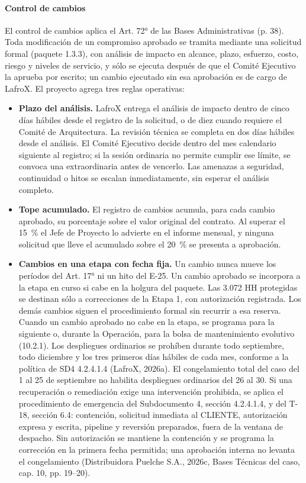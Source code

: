 \paragraph{Control de cambios} El control de cambios aplica el Art. 72° de las Bases Administrativas (p. 38). Toda modificación de un compromiso aprobado se tramita mediante una solicitud formal (paquete 1.3.3), con análisis de impacto en alcance, plazo, esfuerzo, costo, riesgo y niveles de servicio, y sólo se ejecuta después de que el Comité Ejecutivo la aprueba por escrito; un cambio ejecutado sin esa aprobación es de cargo de LafroX. El proyecto agrega tres reglas operativas:
\begin{itemize}
  \item \textbf{Plazo del análisis.} LafroX entrega el análisis de impacto dentro de cinco días hábiles desde el registro de la solicitud, o de diez cuando requiere el Comité de Arquitectura. La revisión técnica se completa en dos días hábiles desde el análisis. El Comité Ejecutivo decide dentro del mes calendario siguiente al registro; si la sesión ordinaria no permite cumplir ese límite, se convoca una extraordinaria antes de vencerlo. Las amenazas a seguridad, continuidad o hitos se escalan inmediatamente, sin esperar el análisis completo.
  \item \textbf{Tope acumulado.} El registro de cambios acumula, para cada cambio aprobado, su porcentaje sobre el valor original del contrato. Al superar el 15~\% el Jefe de Proyecto lo advierte en el informe mensual, y ninguna solicitud que lleve el acumulado sobre el 20~\% se presenta a aprobación.
  \item \textbf{Cambios en una etapa con fecha fija.} Un cambio nunca mueve los períodos del Art. 17° ni un hito del E-25. Un cambio aprobado se incorpora a la etapa en curso si cabe en la holgura del paquete. Las 3.072 HH protegidas se destinan sólo a correcciones de la Etapa 1, con autorización registrada. Los demás cambios siguen el procedimiento formal sin recurrir a esa reserva. Cuando un cambio aprobado no cabe en la etapa, se programa para la siguiente o, durante la Operación, para la bolsa de mantenimiento evolutivo (10.2.1). Los despliegues ordinarios se prohíben durante todo septiembre, todo diciembre y los tres primeros días hábiles de cada mes, conforme a la política de SD4 4.2.4.1.4 (LafroX, 2026a). El congelamiento total del caso del 1 al 25 de septiembre no habilita despliegues ordinarios del 26 al 30. Si una recuperación o remediación exige una intervención prohibida, se aplica el procedimiento de emergencia del Subdocumento 4, sección 4.2.4.1.4, y del T-18, sección 6.4: contención, solicitud inmediata al CLIENTE, autorización expresa y escrita, pipeline y reversión preparados, fuera de la ventana de despacho. Sin autorización se mantiene la contención y se programa la corrección en la primera fecha permitida; una aprobación interna no levanta el congelamiento (Distribuidora Puelche S.A., 2026c, Bases Técnicas del caso, cap. 10, pp. 19--20).
\end{itemize}
